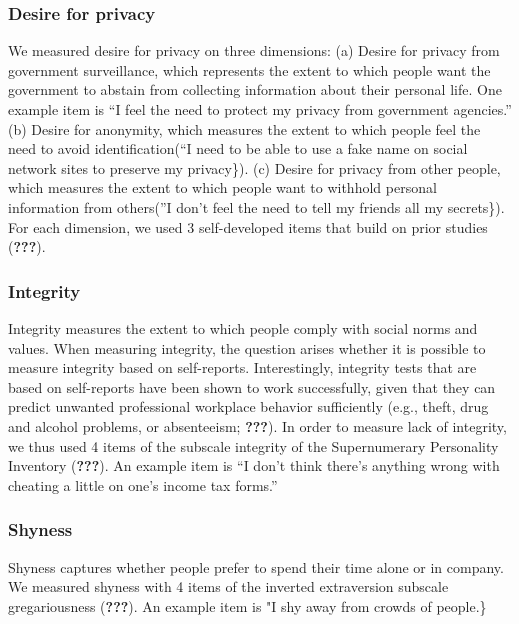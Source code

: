 \documentclass[man]{apa6}
\theoremstyle{definition}
\theoremstyle{definition}
\theoremstyle{definition}
\theoremstyle{remark}
\begin{document}
\hypertarget{desire-for-privacy-1}{%
\subsubsection{Desire for privacy}\label{desire-for-privacy-1}}

We measured desire for privacy on three dimensions: (a) Desire for
privacy from government surveillance, which represents the extent to
which people want the government to abstain from collecting information
about their personal life. One example item is \enquote{I feel the need
to protect my privacy from government agencies.} (b) Desire for
anonymity, which measures the extent to which people feel the need to
avoid identification(\enquote{I need to be able to use a fake name on
social network sites to preserve my privacy\}). (c) Desire for privacy
from other people, which measures the extent to which people want to
withhold personal information from others(}I don't feel the need to tell
my friends all my secrets\}). For each dimension, we used 3
self-developed items that build on prior studies ({\textbf{???}}).

\hypertarget{integrity}{%
\subsubsection{Integrity}\label{integrity}}

Integrity measures the extent to which people comply with social norms
and values. When measuring integrity, the question arises whether it is
possible to measure integrity based on self-reports. Interestingly,
integrity tests that are based on self-reports have been shown to work
successfully, given that they can predict unwanted professional
workplace behavior sufficiently (e.g., theft, drug and alcohol problems,
or absenteeism; {\textbf{???}}). In order to measure lack of integrity,
we thus used 4 items of the subscale integrity of the Supernumerary
Personality Inventory ({\textbf{???}}). An example item is \enquote{I
don't think there's anything wrong with cheating a little on one's
income tax forms.}

\hypertarget{shyness-1}{%
\subsubsection{Shyness}\label{shyness-1}}

Shyness captures whether people prefer to spend their time alone or in
company. We measured shyness with 4 items of the inverted extraversion
subscale gregariousness ({\textbf{???}}). An example item is "I shy away
from crowds of people.\}
\end{document}
